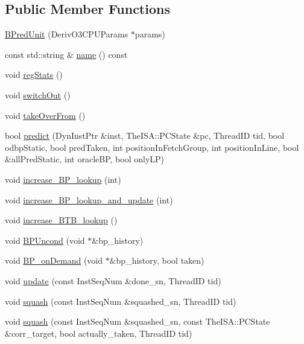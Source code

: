 \subsection*{Public Member Functions}
\begin{DoxyCompactItemize}
\item 
\hyperlink{classBPredUnit_a4d632a2a34745803315809aedf2ce9b1}{BPredUnit} (DerivO3CPUParams $\ast$params)
\item 
const std::string \& \hyperlink{classBPredUnit_aeaaeb15f110f0ed58cc3161d6f6ace22}{name} () const 
\item 
void \hyperlink{classBPredUnit_a0cffcea165538b2e7fd554a92b8d9b85}{regStats} ()
\item 
void \hyperlink{classBPredUnit_ac33c3d29c7b6aca9578fc416eb34e60e}{switchOut} ()
\item 
void \hyperlink{classBPredUnit_a9011bcc9143d2396dfec49828484a645}{takeOverFrom} ()
\item 
bool \hyperlink{classBPredUnit_ad37b550622b7ed76b55d80cc28700699}{predict} (DynInstPtr \&inst, TheISA::PCState \&pc, ThreadID tid, bool odbpStatic, bool predTaken, int positionInFetchGroup, int positionInLine, bool \&allPredStatic, int oracleBP, bool onlyLP)
\item 
void \hyperlink{classBPredUnit_a89690e897bb5661ee868f659a06515c9}{increase\_\-BP\_\-lookup} (int)
\item 
void \hyperlink{classBPredUnit_a471a1acb994d07a6d57b2f39ce56e6a4}{increase\_\-BP\_\-lookup\_\-and\_\-update} (int)
\item 
void \hyperlink{classBPredUnit_a41ecb08c99f45538eaf1de4e184905b4}{increase\_\-BTB\_\-lookup} ()
\item 
void \hyperlink{classBPredUnit_a24bfe00e5e8c2a318930a6474ed60173}{BPUncond} (void $\ast$\&bp\_\-history)
\item 
void \hyperlink{classBPredUnit_a282f0c689c4cedfb52221c1ce96b4084}{BP\_\-onDemand} (void $\ast$\&bp\_\-history, bool taken)
\item 
void \hyperlink{classBPredUnit_aa154b29fbf52ad49d89a046e94b53ac9}{update} (const InstSeqNum \&done\_\-sn, ThreadID tid)
\item 
void \hyperlink{classBPredUnit_a94a04b4bdf8f6b9b3cf33882bc16067b}{squash} (const InstSeqNum \&squashed\_\-sn, ThreadID tid)
\item 
void \hyperlink{classBPredUnit_a78e6f48f8a11db90daab850527d48aa7}{squash} (const InstSeqNum \&squashed\_\-sn, const TheISA::PCState \&corr\_\-target, bool actually\_\-taken, ThreadID tid)
\item 

\end{DoxyCompactItemize}
